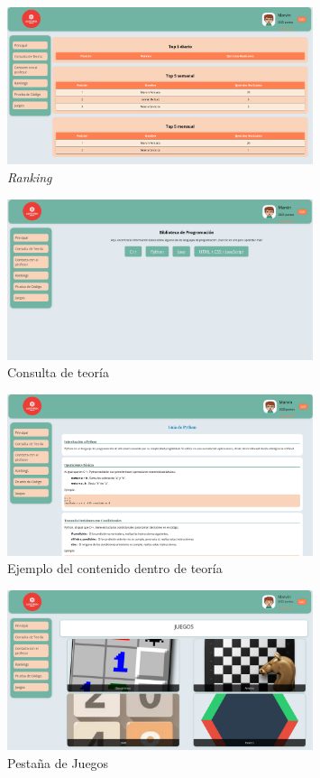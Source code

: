 \begin{appendices}
\begin{figure}[H]
    \centering
    \includegraphics[width=0.8\textwidth]{imagenes/Manual/ranking.png}
    \caption{\textit{Ranking}}
\end{figure}

\begin{figure}[H]
    \centering
    \includegraphics[width=0.8\textwidth]{imagenes/Manual/biblio.png}
    \caption{Consulta de teoría}
\end{figure}

\begin{figure}[H]
    \centering
    \includegraphics[width=0.8\textwidth]{imagenes/Manual/biblio2.png}
    \caption{Ejemplo del contenido dentro de teoría}
\end{figure}

\begin{figure}[H]
    \centering
    \includegraphics[width=0.8\textwidth]{imagenes/Manual/juegos.png}
    \caption{Pestaña de Juegos}
\end{figure}


\end{appendices}
